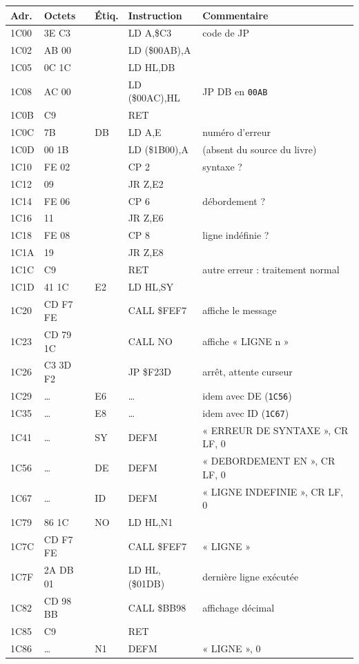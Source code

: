 \documentclass[a4paper,10pt]{article}
\makeatletter
\newcommand{\hex}[1]{\texttt{#1}}
\newenvironment{asm}
  {\small\begin{longtable}{@{}>{\ttfamily}l>{\ttfamily}l>{\ttfamily}l>{\ttfamily}l>{\raggedright\arraybackslash}p{6.2cm}@{}}
   \toprule
   \normalfont\bfseries Adr. & \normalfont\bfseries Octets & \normalfont\bfseries Étiq. & \normalfont\bfseries Instruction & \textbf{Commentaire}\\
   \midrule\endhead
   \bottomrule\endfoot}
  {\end{longtable}}
\makeatother
\begin{document}
\begin{asm}
1C00 & 3E C3    & & LD A,\$C3      & code de JP \\
1C02 & 32 AB 00 & & LD (\$00AB),A  & \\
1C05 & 21 0C 1C & & LD HL,DB       & \\
1C08 & 22 AC 00 & & LD (\$00AC),HL & JP DB en \hex{00AB} \\
1C0B & C9       & & RET            & \\
1C0C & 7B       & DB & LD A,E      & numéro d'erreur \\
1C0D & 32 00 1B & & LD (\$1B00),A  & (absent du source du livre) \\
1C10 & FE 02    & & CP 2           & syntaxe ? \\
1C12 & 28 09    & & JR Z,E2        & \\
1C14 & FE 06    & & CP 6           & débordement ? \\
1C16 & 28 11    & & JR Z,E6        & \\
1C18 & FE 08    & & CP 8           & ligne indéfinie ? \\
1C1A & 28 19    & & JR Z,E8        & \\
1C1C & C9       & & RET            & autre erreur : traitement normal \\
1C1D & 21 41 1C & E2 & LD HL,SY    & \\
1C20 & CD F7 FE & & CALL \$FEF7    & affiche le message \\
1C23 & CD 79 1C & & CALL NO        & affiche « LIGNE n » \\
1C26 & C3 3D F2 & & JP \$F23D      & arrêt, attente curseur \\
1C29 & \dots    & E6 & \dots       & idem avec DE (\hex{1C56}) \\
1C35 & \dots    & E8 & \dots       & idem avec ID (\hex{1C67}) \\
1C41 & \dots    & SY & DEFM        & « ERREUR DE SYNTAXE », CR LF, 0 \\
1C56 & \dots    & DE & DEFM        & « DEBORDEMENT EN », CR LF, 0 \\
1C67 & \dots    & ID & DEFM        & « LIGNE INDEFINIE », CR LF, 0 \\
1C79 & 21 86 1C & NO & LD HL,N1    & \\
1C7C & CD F7 FE & & CALL \$FEF7    & « LIGNE » \\
1C7F & 2A DB 01 & & LD HL,(\$01DB) & dernière ligne exécutée \\
1C82 & CD 98 BB & & CALL \$BB98    & affichage décimal \\
1C85 & C9       & & RET            & \\
1C86 & \dots    & N1 & DEFM        & « LIGNE », 0 \\
\end{asm}
\end{document}
